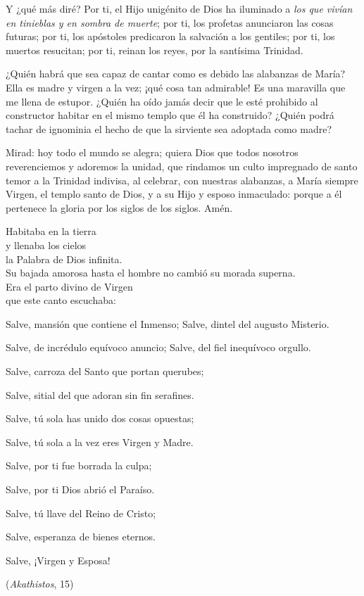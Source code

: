 Y ¿qué más diré? Por ti, el Hijo unigénito de Dios ha iluminado a \emph{los que vivían en tinieblas y en sombra de muerte}; por ti, los profetas anunciaron las cosas futuras; por ti, los apóstoles predicaron la salvación a los gentiles; por ti, los muertos resucitan; por ti, reinan los reyes, por la santísima Trinidad.

¿Quién habrá que sea capaz de cantar como es debido las alabanzas de María? Ella es madre y virgen a la vez; ¡qué cosa tan admirable! Es una maravilla que me llena de estupor. ¿Quién ha oído jamás decir que le esté prohibido al constructor habitar en el mismo templo que él ha construido? ¿Quién podrá tachar de ignominia el hecho de que la sirviente sea adoptada como madre?

Mirad: hoy todo el mundo se alegra; quiera Dios que todos nosotros reverenciemos y adoremos la unidad, que rindamos un culto impregnado de santo temor a la Trinidad indivisa, al celebrar, con nuestras alabanzas, a María siempre Virgen, el templo santo de Dios, y a su Hijo y esposo inmaculado: porque a él pertenece la gloria por los siglos de los siglos. Amén.


Habitaba en la tierra\\ y llenaba los cielos\\ la Palabra de Dios infinita.\\ Su bajada amorosa hasta el hombre no cambió su morada superna.\\ Era el parto divino de Virgen\\ que este canto escuchaba:

Salve, mansión que contiene el Inmenso; Salve, dintel del augusto Misterio.

Salve, de incrédulo equívoco anuncio; Salve, del fiel inequívoco orgullo.

Salve, carroza del Santo que portan querubes;

Salve, sitial del que adoran sin fin serafines.

Salve, tú sola has unido dos cosas opuestas;

Salve, tú sola a la vez eres Virgen y Madre.

Salve, por ti fue borrada la culpa;

Salve, por ti Dios abrió el Paraíso.

Salve, tú llave del Reino de Cristo;

Salve, esperanza de bienes eternos.

Salve, ¡Virgen y Esposa!

(\emph{Akathistos}, 15)

